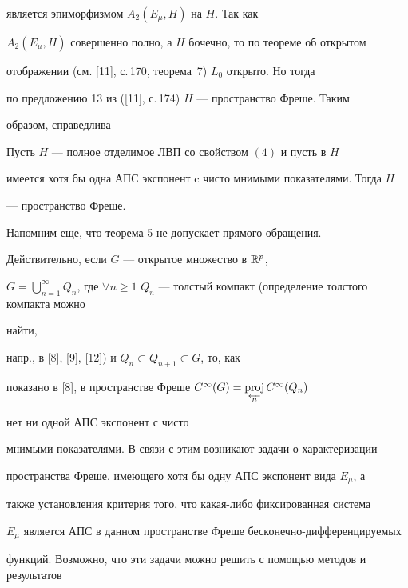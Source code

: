 является эпиморфизмом $A_2(E_{\mu},H)$ на $H$. Так как


$A_2(E_{\mu},H)$ совершенно полно, а $H$ бочечно, то по теореме об открытом


отображении (см. [11], с.\,170, теорема~7) $L_0$ открыто. Но тогда


по предложению 13 из ([11], с.\,174) $H$ --- пространство Фреше. Таким


образом, справедлива








\begin{thm}


Пусть $H$ --- полное отделимое ЛВП со свойством $(4)$ и пусть в $H$


имеется хотя бы одна АПС экспонент c чисто мнимыми показателями. Тогда $H$


--- пространство Фреше.


\end{thm}





Напомним еще, что теорема 5 не допускает прямого обращения.


Действительно, если $G$ --- открытое множество в $\Bbb{R}^p$,


$G=\bigcup\limits_{n=1}^{\infty}Q_n$, где $\forall n


\ge 1$ \; $Q_n$ --- толстый компакт (определение толстого компакта можно


найти,


напр., в [8], [9], [12]) и $Q_n\subset Q_{n+1}\subset G$, то, как


показано в [8], в пространстве Фреше $C^\infty(G)=\proj\limits_{


\overleftarrow{\ n\ }}C^{\infty}(Q_n)$ 


нет ни одной АПС экспонент с чисто


мнимыми показателями. В связи с этим возникают задачи о характеризации


пространства Фреше, имеющего хотя бы одну АПС экспонент вида $E_{\mu}$, а


также установления критерия того, что какая-либо фиксированная система


$E_{\mu}$ является АПС в данном пространстве Фреше бесконечно-дифференцируемых


функций. Возможно, что эти задачи можно решить с помощью методов и результатов


